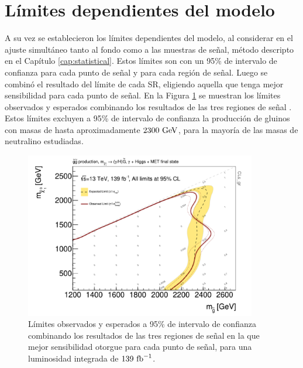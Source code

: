 \section{Límites dependientes del modelo}


A su vez se establecieron los límites dependientes del modelo, al considerar en el ajuste simultáneo tanto al fondo como a las muestras de señal, método descripto en el Capítulo \ref{cap:statistical}. Estos límites son con un 95\% de intervalo de confianza para cada punto de señal y para cada región de señal. Luego se combinó el resultado del límite de cada SR, eligiendo aquella que tenga mejor sensibilidad para cada punto de señal. En la Figura \ref{fig:limit_plot_combined} se muestran los límites observados y esperados combinando los resultados de las tres regiones de señal . Estos límites excluyen a 95\% de intervalo de confianza la producción de gluinos con masas de hasta aproximadamente $2300\ \text{GeV}$, para la mayoría de las masas de neutralino estudiadas.


\begin{figure}[ht!]
  \centering


  \includegraphics[width=0.9\textwidth]{images_tmp/results/limits_plots/contour_plot_gHBestSR_wMatplotLib_full.pdf}
  \caption{Límites observados y esperados a 95\% de intervalo de confianza combinando los resultados de las tres regiones de señal en la que mejor sensibilidad otorgue para cada punto de señal, para una luminosidad integrada de $139\ \ifb$.}
  \label{fig:limit_plot_combined}

\end{figure}
